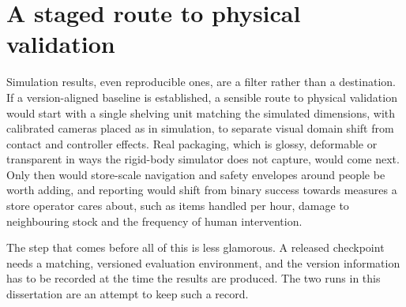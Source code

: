 \section{A staged route to physical validation}

Simulation results, even reproducible ones, are a filter rather than a destination. If a version-aligned baseline is established, a sensible route to physical validation would start with a single shelving unit matching the simulated dimensions, with calibrated cameras placed as in simulation, to separate visual domain shift from contact and controller effects. Real packaging, which is glossy, deformable or transparent in ways the rigid-body simulator does not capture, would come next. Only then would store-scale navigation and safety envelopes around people be worth adding, and reporting would shift from binary success towards measures a store operator cares about, such as items handled per hour, damage to neighbouring stock and the frequency of human intervention.

The step that comes before all of this is less glamorous. A released checkpoint needs a matching, versioned evaluation environment, and the version information has to be recorded at the time the results are produced. The two runs in this dissertation are an attempt to keep such a record.

\endgroup
